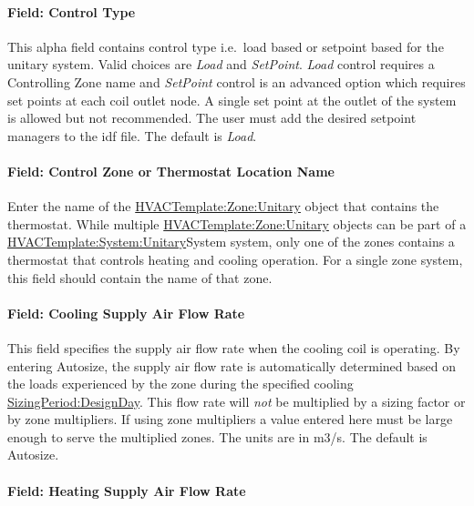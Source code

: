 \paragraph{Field: Control Type}\label{field-control-type-002}

This alpha field contains control type i.e.~load based or setpoint based for the unitary system. Valid choices are \emph{Load} and \emph{SetPoint}. \emph{Load} control requires a Controlling Zone name and \emph{SetPoint} control is an advanced option which requires set points at each coil outlet node. A single set point at the outlet of the system is allowed but not recommended. The user must add the desired setpoint managers to the idf file. The default is \emph{Load}.

\paragraph{Field: Control Zone or Thermostat Location Name}\label{field-control-zone-or-thermostat-location-name-2}

Enter the name of the \hyperref[hvactemplatezoneunitary]{HVACTemplate:Zone:Unitary} object that contains the thermostat. While multiple \hyperref[hvactemplatezoneunitary]{HVACTemplate:Zone:Unitary} objects can be part of a \hyperref[hvactemplatesystemunitary]{HVACTemplate:System:Unitary}System system, only one of the zones contains a thermostat that controls heating and cooling operation. For a single zone system, this field should contain the name of that zone.

\paragraph{Field: Cooling Supply Air Flow Rate}\label{field-cooling-supply-air-flow-rate-5}

This field specifies the supply air flow rate when the cooling coil is operating. By entering Autosize, the supply air flow rate is automatically determined based on the loads experienced by the zone during the specified cooling \hyperref[sizingperioddesignday]{SizingPeriod:DesignDay}. This flow rate will \emph{not} be multiplied by a sizing factor or by zone multipliers. If using zone multipliers a value entered here must be large enough to serve the multiplied zones. The units are in m3/s. The default is Autosize.

\paragraph{Field: Heating Supply Air Flow Rate}\label{field-heating-supply-air-flow-rate-5}

